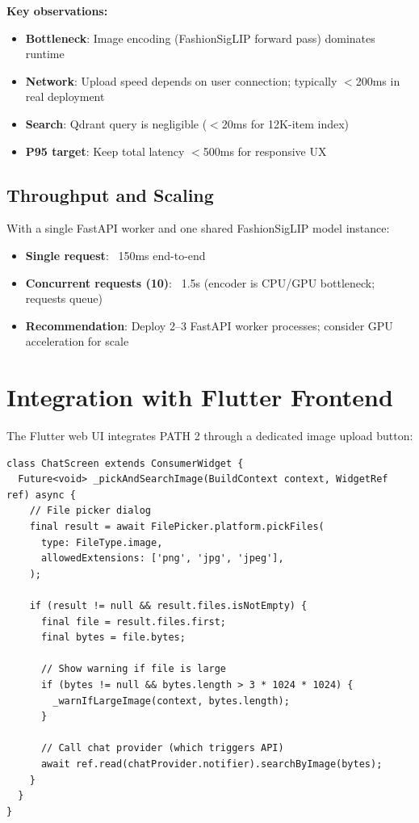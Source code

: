 \documentclass[12pt, twoside]{report}
\begin{document}
\textbf{Key observations:}
\begin{itemize}
    \item \textbf{Bottleneck}: Image encoding (FashionSigLIP forward pass) dominates runtime
    \item \textbf{Network}: Upload speed depends on user connection; typically $<$200ms in real deployment
    \item \textbf{Search}: Qdrant query is negligible ($<$20ms for 12K-item index)
    \item \textbf{P95 target}: Keep total latency $<$500ms for responsive UX
\end{itemize}

\subsection{Throughput and Scaling}

With a single FastAPI worker and one shared FashionSigLIP model instance:
\begin{itemize}
    \item \textbf{Single request}: ~150ms end-to-end
    \item \textbf{Concurrent requests (10)}: ~1.5s (encoder is CPU/GPU bottleneck; requests queue)
    \item \textbf{Recommendation}: Deploy 2--3 FastAPI worker processes; consider GPU acceleration for scale
\end{itemize}

\section{Integration with Flutter Frontend}

The Flutter web UI integrates PATH 2 through a dedicated image upload button:

\begin{lstlisting}[caption={Flutter Image Search Integration --- chat\_screen.dart}]
class ChatScreen extends ConsumerWidget {
  Future<void> _pickAndSearchImage(BuildContext context, WidgetRef ref) async {
    // File picker dialog
    final result = await FilePicker.platform.pickFiles(
      type: FileType.image,
      allowedExtensions: ['png', 'jpg', 'jpeg'],
    );
    
    if (result != null && result.files.isNotEmpty) {
      final file = result.files.first;
      final bytes = file.bytes;
      
      // Show warning if file is large
      if (bytes != null && bytes.length > 3 * 1024 * 1024) {
        _warnIfLargeImage(context, bytes.length);
      }
      
      // Call chat provider (which triggers API)
      await ref.read(chatProvider.notifier).searchByImage(bytes);
    }
  }
}
\end{lstlisting}
\end{document}
